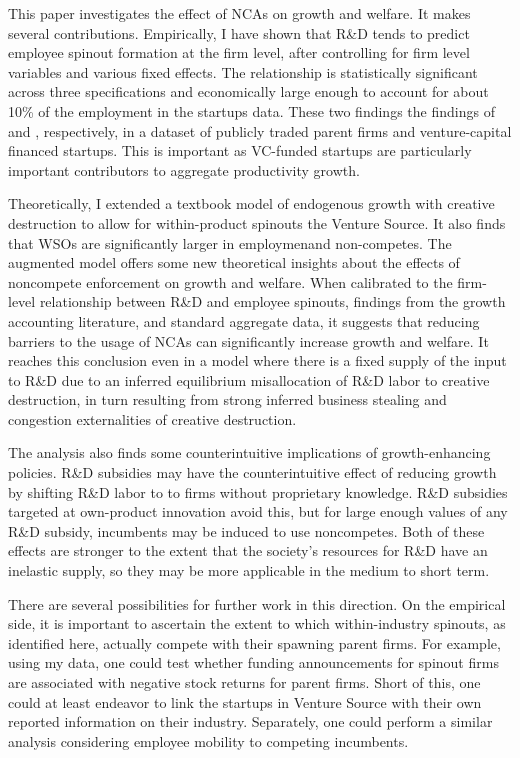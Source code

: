 \documentclass[11pt,english]{article}
\begin{document}
This paper investigates the effect of NCAs on growth and welfare. It makes several contributions. Empirically, I have shown that R\&D tends to predict employee spinout formation at the firm level, after controlling for firm level variables and various fixed effects. The relationship is statistically significant across three specifications and economically large enough to account for about 10\% of the employment in the startups data. These two findings the findings of \cite{babina_entrepreneurial_2019} and \cite{muendler_employee_2012}, respectively, in a dataset of publicly traded parent firms and venture-capital financed startups. This is important as VC-funded startups are particularly important contributors to aggregate productivity growth. 

Theoretically, I extended a textbook model of endogenous growth with creative destruction to allow for within-product spinouts the Venture Source. It also finds that WSOs are significantly larger in employmenand non-competes. The augmented model offers some new theoretical insights about the effects of noncompete enforcement on growth and welfare. When calibrated to the firm-level relationship between R\&D and employee spinouts, findings from the growth accounting literature, and standard aggregate data, it suggests that reducing barriers to the usage of NCAs can significantly increase growth and welfare. It reaches this conclusion even in a model where there is a fixed supply of the input to R\&D due to an inferred equilibrium misallocation of R\&D labor to creative destruction, in turn resulting from strong inferred business stealing and congestion externalities of creative destruction.

The analysis also finds some counterintuitive implications of growth-enhancing policies. R\&D subsidies may have the counterintuitive effect of reducing growth by shifting R\&D labor to to firms without proprietary knowledge. R\&D subsidies targeted at own-product innovation avoid this, but for large enough values of any R\&D subsidy, incumbents may be induced to use noncompetes. Both of these effects are stronger to the extent that the society's resources for R\&D have an inelastic supply, so they may be more applicable in the medium to short term.

There are several possibilities for further work in this direction. On the empirical side, it is important to ascertain the extent to which within-industry spinouts, as identified here, actually compete with their spawning parent firms. For example, using my data, one could test whether funding announcements for spinout firms are associated with negative stock returns for parent firms. Short of this, one could at least endeavor to link the startups in Venture Source with their own reported information on their industry. Separately, one could perform a similar analysis considering employee mobility to competing incumbents. 
\end{document}
